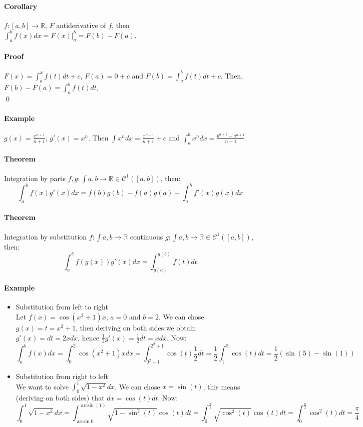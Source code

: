 \documentclass{article}
\newcommand{\functoR}[2]{#1 : #2 \rightarrow \mathbb{R}}
\newcommand{\intcc}[1]{\left[#1\right]}
\newcommand{\C}{\mathcal{C}}
\newcommand{\Theorem}{\paragraph{Theorem}}
\newcommand{\Corollary}{\paragraph{Corollary}}
\newcommand{\Proof}{\paragraph{Proof}}
\newcommand{\Example}{\paragraph{Example}}
\begin{document}
  \Corollary $\functoR{f}{\intcc{a,b}}$, $F$ antiderivative of $f$, then
  $\int_a^b f(x) dx = F(x) |_a^b = F(b) - F(a)$.

  \Proof $F(x) = \int_a^x f(t) dt + c$, $F(a) = 0 + c$ and $F(b) = \int_a^b
  f(t) dt + c$. Then, $F(b) - F(a) = \int_a^b f(t) dt$.
\\\qed

  \Example $g(x) = \frac{x^{n+1}}{n+1}$, $g'(x) = x^n$. Then $\int x^n dx =
  \frac{x^{n+1}}{n+1} + c$ and $\int_a^b x^n dx = \frac{b^{n+1} - a^{n+1}}{n+1}$.

  \Theorem Integration by parts
  $\functoR{f,g}{\int{a,b}} \in \C^1(\intcc{a,b})$, then:
  \begin{equation*}
    \int_a^b f(x) g'(x) dx = f(b)g(b) - f(a)g(a) - \int_a^b f'(x)g(x) dx
  \end{equation*}

  \Theorem Integration by substitution
  $\functoR{f}{\int{a,b}}$ continuous $\functoR{g}{\int{a,b}} \in
  \C^1(\intcc{a,b})$, then:
  \begin{equation*}
    \int_a^b f(g(x))g'(x) dx = \int_{g(a)}^{g(b)} f(t) dt
  \end{equation*}

  \Example
  \begin{itemize}
    \item Substitution from left to right
  \\Let $f(x) = \cos(x^2 + 1) x$, $a = 0$ and $b = 2$. We can chose $g(x) = t =
    x^2 + 1$, then deriving on both sides we obtain $g'(x) = dt = 2x dx$, hence
    $\frac{1}{2} g'(x) = \frac{1}{2} dt = x dx$. Now:
    \begin{equation*}
      \int_a^b f(x) dx =
      \int_0^2 \cos(x^2 + 1) x dx =
      \int_{0^2+1}^{2^2+1} \cos(t) \frac{1}{2} dt =
      \frac{1}{2} \int_1^5 \cos(t) dt =
      \frac{1}{2} \left(\sin(5) - \sin(1)\right)
    \end{equation*}

    \item Substitution from right to left
  \\We want to solve $\int_0^1 \sqrt{1-x^2}dx$. We can chose $x = \sin(t)$, this
    means (deriving on both sides) that $dx = \cos(t)dt$. Now:
    \begin{equation*}
      \int_0^1 \sqrt{1-x^2} dx =
      \int_{\arcsin{0}}^{\arcsin(1)} \sqrt{1-\sin^2(t)} \cos(t) dt =
      \int_0^{\frac{\pi}{2}} \sqrt{\cos^2(t)} \cos(t) dt =
      \int_0^{\frac{\pi}{2}} \cos^2(t) dt =
      \frac{\pi}{4}
    \end{equation*}
  \end{itemize}

\end{document}
